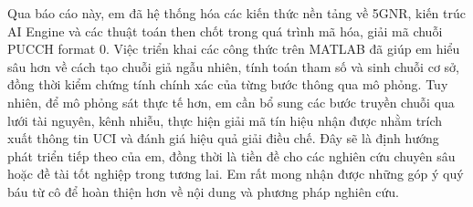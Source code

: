 \documentclass[13pt]{report}
\begin{document}
Qua báo cáo này, em đã hệ thống hóa các kiến thức nền tảng về 5GNR, kiến trúc AI Engine và các thuật toán then chốt trong quá trình mã hóa, giải mã chuỗi PUCCH format 0. Việc triển khai các công thức trên MATLAB đã giúp em hiểu sâu hơn về cách tạo chuỗi giả ngẫu nhiên, tính toán tham số và sinh chuỗi cơ sở, đồng thời kiểm chứng tính chính xác của từng bước thông qua mô phỏng. Tuy nhiên, để mô phỏng sát thực tế hơn, em cần bổ sung các bước truyền chuỗi qua lưới tài nguyên, kênh nhiễu, thực hiện giải mã tín hiệu nhận được nhằm trích xuất thông tin UCI và đánh giá hiệu quả giải điều chế. Đây sẽ là định hướng phát triển tiếp theo của em, đồng thời là tiền đề cho các nghiên cứu chuyên sâu hoặc đề tài tốt nghiệp trong tương lai. Em rất mong nhận được những góp ý quý báu từ cô để hoàn thiện hơn về nội dung và phương pháp nghiên cứu.


\newpage\printbibliography[title={Tài liệu tham khảo}]
\end{document}
